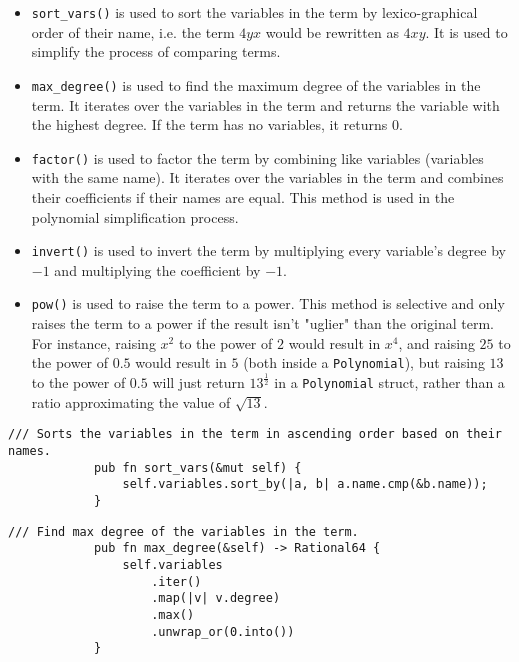 \begin{itemize}
    \item \verb|sort_vars()| is used to sort the variables in the term by lexico-graphical order of their name, i.e. the term $4yx$ would be rewritten as $4xy$. It is used to simplify the process of comparing terms.
    \item \verb|max_degree()| is used to find the maximum degree of the variables in the term. It iterates over the variables in the term and returns the variable with the highest degree. If the term has no variables, it returns $0$.
    \item \verb|factor()| is used to factor the term by combining like variables (variables with the same name). It iterates over the variables in the term and combines their coefficients if their names are equal. This method is used in the polynomial simplification process.
    \item \verb|invert()| is used to invert the term by multiplying every variable's degree by $-1$ and multiplying the coefficient by $-1$.
    \item \verb|pow()| is used to raise the term to a power. This method is selective and only raises the term to a power if the result isn't "uglier" than the original term. For instance, raising $x^2$ to the power of $2$ would result in $x^4$, and raising $25$ to the power of $0.5$ would result in $5$ (both inside a \verb|Polynomial|), but raising $13$ to the power of $0.5$ will just return $13^{\frac{1}{2}}$ in a \verb|Polynomial| struct, rather than a ratio approximating the value of $\sqrt{13}$.
\end{itemize}

    \begin{minipage}{\linewidth}
        \begin{lstlisting}[caption={The implementation of the \texttt{sort\_vars()} method for the \texttt{Term} struct}, label={lst:term-sort-vars}]
            /// Sorts the variables in the term in ascending order based on their names.
            pub fn sort_vars(&mut self) {
                self.variables.sort_by(|a, b| a.name.cmp(&b.name));
            }
        \end{lstlisting}
    \end{minipage}

    \begin{minipage}{\linewidth}
        \begin{lstlisting}[caption={The implementation of the \texttt{max\_degree()} method for the \texttt{Term} struct}, label={lst:term-max-degree}]
            /// Find max degree of the variables in the term.
            pub fn max_degree(&self) -> Rational64 {
                self.variables
                    .iter()
                    .map(|v| v.degree)
                    .max()
                    .unwrap_or(0.into())
            }
        \end{lstlisting}
    \end{minipage}

